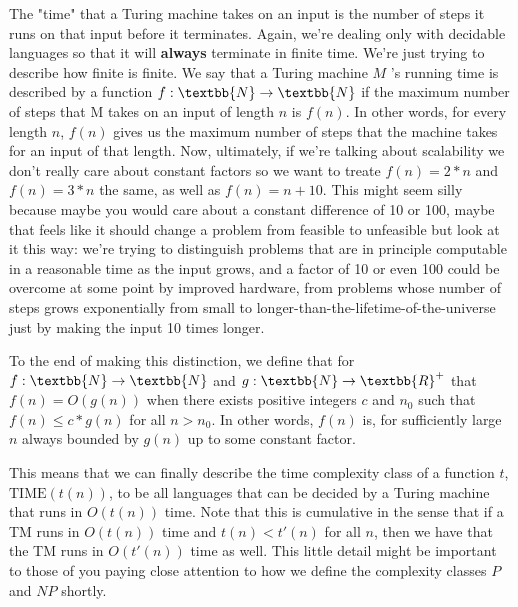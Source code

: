 \documentclass[11pt]{article}
\begin{document}
The "time" that a Turing machine takes on an input is the number of steps it runs on that input before it terminates. Again, we're dealing only with decidable languages so that it will \textbf{always} terminate in finite time. We're just trying to describe how finite is finite.  We say that a Turing machine $M$ 's running time is described by a function $f : \textbb{N} \to \textbb{N}$ if the maximum number of steps that M takes on an input of length $n$ is $f(n)$. In other words, for every length $n$, $f(n)$ gives us the maximum number of steps that the machine takes for an input of that length. Now, ultimately, if we're talking about scalability we don't really care about constant factors so we want to treate $f(n) = 2*n$ and $f(n) = 3*n$ the same, as well as $f(n) = n + 10$. This might seem silly because maybe you would care about a constant difference of 10 or 100, maybe that feels like it should change a problem from feasible to unfeasible but look at it this way: we're trying to distinguish problems that are in principle computable in a reasonable time as the input grows, and a factor of 10 or even 100 could be overcome at some point by improved hardware, from problems whose number of steps grows exponentially from small to longer-than-the-lifetime-of-the-universe just by making the input 10 times longer.

To the end of making this distinction, we define that for $f : \textbb{N} \to \textbb{N}$ and $g : \textbb{N} \to \textbb{R}^+$ that $f(n) = O(g(n))$ when there exists positive integers $c$ and $n_0$ such that $f(n) \le c*g(n)$ for all $n > n_0$. In other words, $f(n)$ is, for sufficiently large $n$ always bounded by $g(n)$ up to some constant factor. 

This means that we can finally describe the time complexity class of a function $t$, $\text{TIME}(t(n))$, to be all languages that can be decided by a Turing machine that runs in $O(t(n))$ time. Note that this is cumulative in the sense that if a TM runs in $O(t(n))$ time and $t(n) < t'(n)$ for all $n$, then we have that the TM runs in $O(t'(n))$ time as well. This little detail might be important to those of you paying close attention to how we define the complexity classes $P$ and $NP$ shortly.
\end{document}
